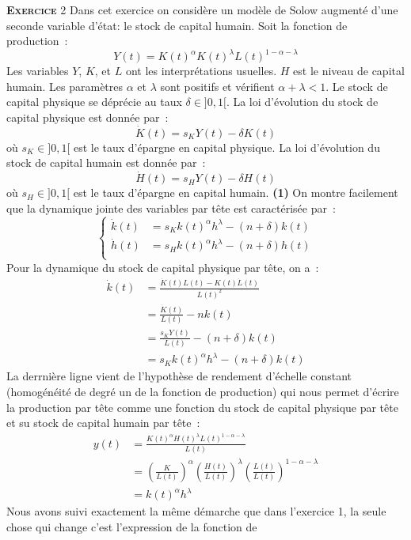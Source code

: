 \documentclass[10pt,a4paper,notitlepage,twocolumn]{article}
\newcommand{\exercice}[1]{\textsc{\textbf{Exercice}} #1}
\newcommand{\question}[1]{\textbf{(#1)}}
\begin{document}
\exercice{2} Dans cet exercice on considère un modèle de Solow
augmenté d'une seconde variable d'état: le stock de capital humain.
Soit la fonction de production :
\[
Y(t) = K(t)^{\alpha}K(t)^{\lambda}L(t)^{1-\alpha-\lambda}
\]
Les variables $Y$,  $K$, et $L$ ont  les interprétations usuelles.
$H$ est le niveau de capital humain.  Les paramètres $\alpha$ et
$\lambda$ sont  positifs et  vérifient $\alpha+\lambda<1$.  Le  stock de
capital physique se  déprécie au taux $\delta\in]0,1[$.   La loi d'évolution
du stock de capital physique est donnée par :
\[
\dot{K}(t) = s_{K} Y(t) - \delta K(t)
\]
où $s_{K}\in]0,1[$ est le taux d'épargne en capital physique. La loi
d'évolution du stock de capital humain est donnée par :
\[
\dot{H}(t) = s_{H} Y(t) - \delta H(t)
\]
où $s_{H}\in]0,1[$ est le taux d'épargne en capital
humain. \question{1} On montre facilement que la dynamique jointe des variables par
tête est caractérisée par :
\[
  \begin{cases}
    \dot{k}(t) &= s_{K}k(t)^{\alpha}h^{\lambda} - (n+\delta)k(t)\\
    \dot{h}(t) &= s_{H}k(t)^{\alpha}h^{\lambda} - (n+\delta)h(t)\\
  \end{cases}
\]
Pour la dynamique du stock de capital physique par tête, on a :
\[
  \begin{split}
    \dot{k}(t) &= \frac{\dot K(t)L(t) - K(t)\dot L(t)}{L(t)^2}\\
    &= \frac{\dot K(t)}{L(t)} - nk(t)\\
    &= \frac{s_KY(t)}{L(t)}-(n+\delta)k(t)\\
    &= s_Kk(t)^{\alpha}h^{\lambda}-(n+\delta)k(t)
  \end{split}
\]
La derrnière ligne vient de l'hypothèse de rendement d'échelle
constant (homogénéité de degré un de la fonction de production) qui
nous permet d'écrire la production par tête comme une fonction du
stock de capital physique par tête et su stock de capital humain par
tête :
\[
  \begin{split}
    y(t) &= \frac{K(t)^{\alpha}H(t)^{\lambda}L(t)^{1-\alpha-\lambda}}{L(t)}\\
    &= \left(\frac{K}{L(t)}\right)^{\alpha}\left(\frac{H(t)}{L(t)}\right)^{\lambda}\left(\frac{L(t)}{L(t)}\right)^{1-\alpha-\lambda}\\
    &= k(t)^{\alpha}h^{\lambda}
  \end{split}
\]
Nous avons suivi exactement la même démarche que dans l'exercice 1, la
seule chose qui change c'est l'expression de la fonction de
\end{document}
